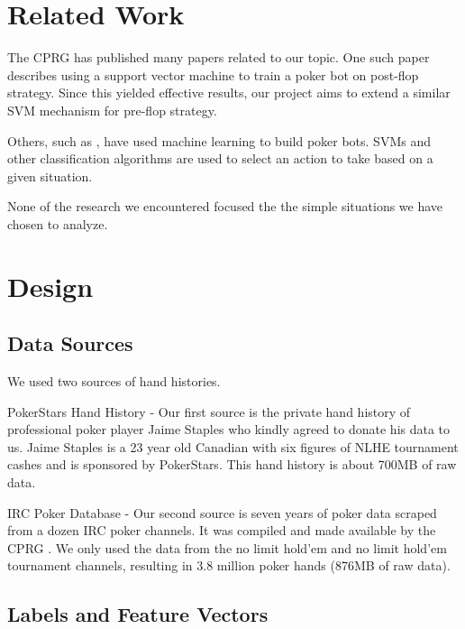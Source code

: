 \documentclass[twoside]{article}
\begin{document}
\begin{multicols}{2}

\section{Related Work}

The CPRG has published many papers related to our topic.
One such paper \cite{SVMPoker} describes using a support vector machine to train a poker bot on post-flop strategy. Since this yielded effective results, our project aims to extend a similar SVM mechanism for pre-flop strategy.

Others, such as \cite{holdemml}, have used machine learning to build poker bots. SVMs and other classification algorithms are used to select an action to take based on a given situation.

None of the research we encountered focused the the simple situations we have chosen to analyze.


\section{Design}

\subsection{Data Sources}
We used two sources of hand histories.
\begin{compactitem}
\item{PokerStars Hand History} - Our first source is the private hand history of professional poker player Jaime Staples who kindly agreed to donate his data to us. Jaime Staples is a 23 year old Canadian with six figures of NLHE tournament cashes \cite{JaimeStaples} and is sponsored by PokerStars. This hand history is about 700MB of raw data.
\item{IRC Poker Database} - Our second source is seven years of poker data scraped from a dozen IRC poker channels. It was compiled and made available by the CPRG \cite{IRCDatabase}. 
We only used the data from the no limit hold'em and  no limit hold'em tournament channels, resulting in 3.8 million poker hands (876MB of raw data). 
\end{compactitem}

\subsection{Labels and Feature Vectors}


\end{multicols}
\end{document}
